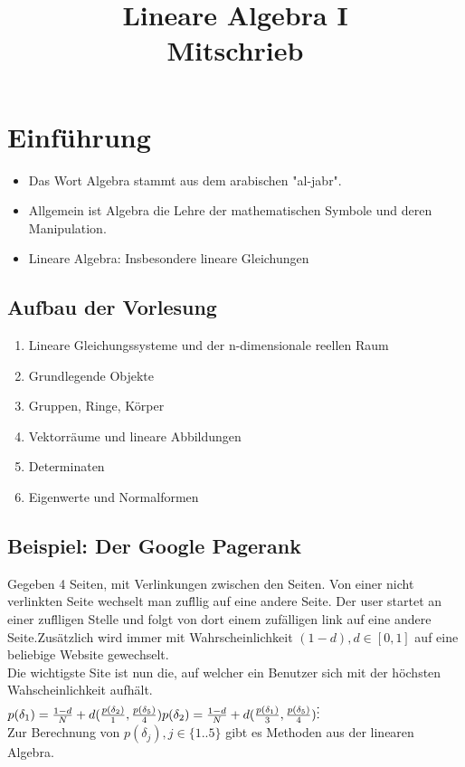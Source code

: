 \documentclass{scrartcl}
\title{Lineare Algebra I\\Mitschrieb}
\begin{document}
\maketitle
\tableofcontents
\pagebreak

\section{Einf\"uhrung}
\begin{itemize}
\item{Das Wort Algebra stammt aus dem arabischen "al-jabr".}
\item{Allgemein ist Algebra die Lehre der mathematischen Symbole und deren Manipulation.}
\item{Lineare Algebra: Insbesondere lineare Gleichungen}
\end{itemize}

\subsection{Aufbau der Vorlesung}
\begin{enumerate}
\item{Lineare Gleichungssysteme und der n-dimensionale reellen Raum}
\item{Grundlegende Objekte}
\item{Gruppen, Ringe, K\"orper}
\item{Vektorr\"aume und lineare Abbildungen}
\item{Determinaten}
\item{Eigenwerte und Normalformen}
\end{enumerate}

\subsection{Beispiel: Der Google Pagerank}
Gegeben 4 Seiten, mit Verlinkungen zwischen den Seiten. Von einer nicht  verlinkten Seite wechselt man zuf\"llig auf eine andere Seite. Der user startet an einer zuf\"lligen Stelle und folgt von dort einem zuf\"alligen link auf eine andere Seite.Zus\"atzlich wird immer mit Wahrscheinlichkeit \((1-d), d \in [0, 1]\) auf eine beliebige Website gewechselt.\\
Die wichtigste Site ist nun die, auf welcher ein Benutzer sich mit der h\"ochsten Wahscheinlichkeit aufh\"alt.\\
\(
p(\delta_1) = \frac{1-d}{N} + d(\frac{p(\delta_2)}{1}, \frac{p(\delta_5)}{4})\\
p(\delta_2) = \frac{1-d}{N} + d(\frac{p(\delta_1)}{3}, \frac{p(\delta_5)}{4})\\
\vdots
\)\\
Zur Berechnung von \(p(\delta_j), j \in \{1..5\}\) gibt es Methoden aus der linearen Algebra.
\end{document}

